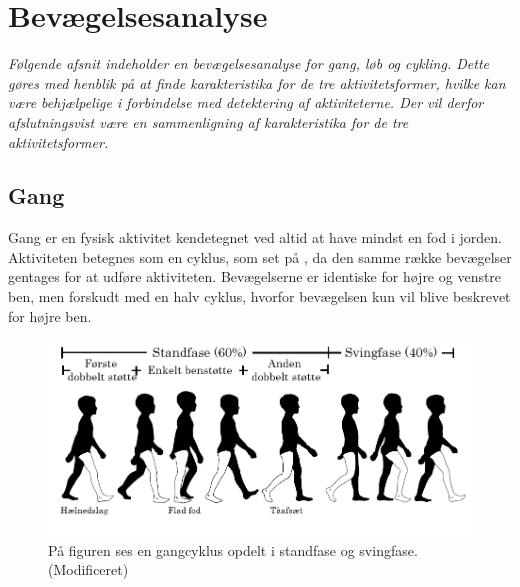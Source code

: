 \section{Bevægelsesanalyse} \label{bevaegelse}
\textit{Følgende afsnit indeholder en bevægelsesanalyse for gang, løb og cykling. Dette gøres med henblik på at finde karakteristika for de tre aktivitetsformer, hvilke kan være behjælpelige i forbindelse med detektering af aktiviteterne. Der vil derfor afslutningsvist være en sammenligning af karakteristika for de tre aktivitetsformer.}

\subsection{Gang}
Gang er en fysisk aktivitet kendetegnet ved altid at have mindst en fod i jorden. Aktiviteten betegnes som en cyklus, som set på , da den samme række bevægelser gentages for at udføre aktiviteten. Bevægelserne er identiske for højre og venstre ben, men forskudt med en halv cyklus, hvorfor bevægelsen kun vil blive beskrevet for højre ben. \citep{VaughanDavisOConnor1992,Whittle1990} 

\begin{figure}[H]
	\centering
	\includegraphics[scale=0.7]{figures/bProblemloesning/gang_cyklus.png}
	\caption{På figuren ses en gangcyklus opdelt i standfase og svingfase. \citep{VaughanDavisOConnor1992} (Modificeret)}
	\label{fig:gang_cyklus}
\end{figure}
	
